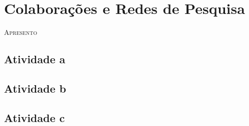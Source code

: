 \chapter{Colaborações e Redes de Pesquisa}

%


\lettrine[lines=2, lhang=0.33, loversize=0.25, findent=1.5em]{A}{presento} 
\lipsum[50]


\section{Atividade a}
\lipsum[49]

\lipsum[50]

\lipsum[51]

\section{Atividade b}
\lipsum[52]

\lipsum[53]

\lipsum[54]

\section{Atividade c}

\lipsum[55]

\lipsum[56]

\lipsum[57]

